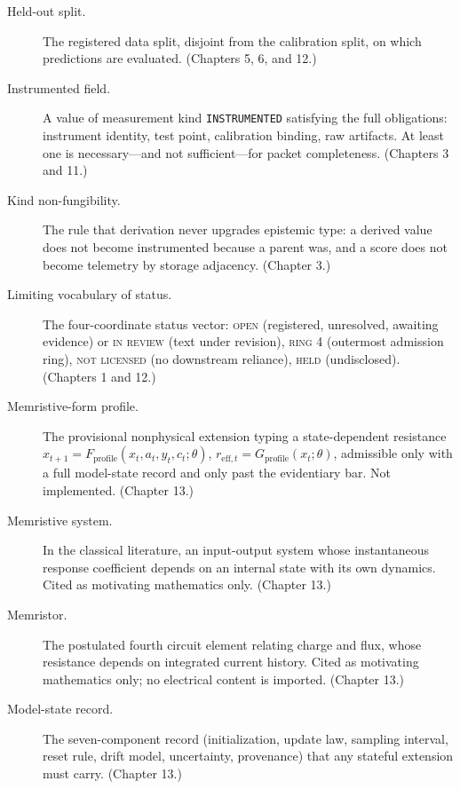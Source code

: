 \begin{description}
\item[Held-out split.] The registered data split, disjoint from the calibration split, on which predictions are evaluated. (Chapters 5, 6, and 12.)

\item[Instrumented field.] A value of measurement kind \texttt{INSTRUMENTED} satisfying the full obligations: instrument identity, test point, calibration binding, raw artifacts. At least one is necessary---and not sufficient---for packet completeness. (Chapters 3 and 11.)

\item[Kind non-fungibility.] The rule that derivation never upgrades epistemic type: a derived value does not become instrumented because a parent was, and a score does not become telemetry by storage adjacency. (Chapter 3.)

\item[Limiting vocabulary of status.] The four-coordinate status vector: \textsc{open} (registered, unresolved, awaiting evidence) or \textsc{in review} (text under revision), \textsc{ring 4} (outermost admission ring), \textsc{not licensed} (no downstream reliance), \textsc{held} (undisclosed). (Chapters 1 and 12.)

\item[Memristive-form profile.] The provisional nonphysical extension typing a state-dependent resistance $x_{t+1} = F_{\mathrm{profile}}(x_t,a_t,y_t,c_t;\theta)$, $r_{\mathrm{eff},t} = G_{\mathrm{profile}}(x_t;\theta)$, admissible only with a full model-state record and only past the evidentiary bar. Not implemented. (Chapter 13.)

\item[Memristive system.] In the classical literature, an input-output system whose instantaneous response coefficient depends on an internal state with its own dynamics. Cited as motivating mathematics only. (Chapter 13.)

\item[Memristor.] The postulated fourth circuit element relating charge and flux, whose resistance depends on integrated current history. Cited as motivating mathematics only; no electrical content is imported. (Chapter 13.)

\item[Model-state record.] The seven-component record (initialization, update law, sampling interval, reset rule, drift model, uncertainty, provenance) that any stateful extension must carry. (Chapter 13.)


\end{description}
